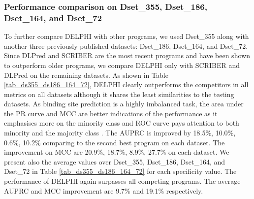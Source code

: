 \documentclass{bioinfo}
\begin{document}
\subsubsection{Performance comparison on Dset\_355, Dset\_186, Dset\_164, and Dset\_72}\label{section_four_tests}
To further compare DELPHI with other programs, we used Dset\_355 along with another three previously published datasets: Dset\_186, Dset\_164, and Dset\_72. Since DLPred and SCRIBER are the most recent programs and have been shown to outperform older programs, we compare DELPHI only with SCRIBER and DLPred on the remaining datasets. As shown in Table \ref{tab_ds355_ds186_164_72}, DELPHI clearly outperforms the competitors in all metrics on all datasets although it shares the least similarities to the testing datasets. As binding site prediction is a highly imbalanced task, the area under the PR curve and MCC are better indications of the performance as it emphasises more on the minority class and ROC curve pays attention to both minority and the majority class \citep{andluis2016survey}. The AUPRC is improved by 18.5\%, 10.0\%, 0.6\%, 10.2\% comparing to the second best program on each dataset. The improvement on MCC are 20.9\%, 18.7\%, 8.9\%, 27.7\% on each dataset. We present also the average values over Dset\_355, Dset\_186, Dset\_164, and Dset\_72 in Table \ref{tab_ds355_ds186_164_72} for each specificity value. The performance of DELPHI again surpasses all competing programs. The average AUPRC and MCC improvement are 9.7\% and 19.1\% respectively.  
\end{document}
